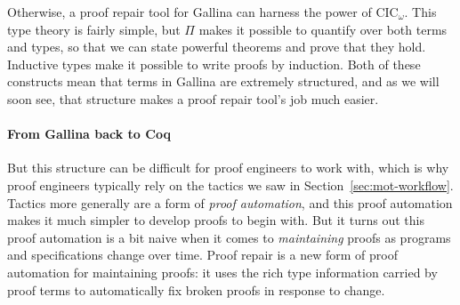 Otherwise, a proof repair tool for Gallina can harness the power of CIC$_{\omega}$. This type theory is fairly simple,
but $\Pi$ makes it possible to quantify over both terms and types,
so that we can state powerful theorems and prove that they hold.
Inductive types make it possible to write proofs by induction.
Both of these constructs mean that terms in Gallina are extremely structured,
and as we will soon see, that structure makes a proof repair tool's job much easier.

\paragraph{From Gallina back to Coq}
But this structure can be difficult for proof engineers to work with,
which is why proof engineers typically rely on the tactics we saw in Section~\ref{sec:mot-workflow}.
Tactics more generally are a form of \textit{proof automation}, and this proof automation makes it much
simpler to develop proofs to begin with.
But it turns out this proof automation is a bit naive when it comes to \textit{maintaining} proofs
as programs and specifications change over time.
Proof repair is a new form of proof automation for maintaining proofs: it uses the rich type information carried by proof terms
to automatically fix broken proofs in response to change.



